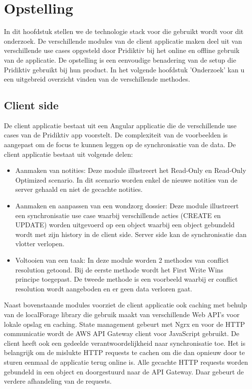 
\chapter{Opstelling}
\label{ch:setup}


In dit hoofdstuk stellen we de technologie stack voor die gebruikt wordt voor dit onderzoek. De verschillende modules van de client applicatie maken deel uit van verschillende use cases opgesteld door Pridiktiv bij het online en offline gebruik van de applicatie. De opstelling is een eenvoudige benadering van de setup die Pridiktiv gebruikt bij hun product. In het volgende hoofdstuk 'Onderzoek' kan u een uitgebreid overzicht vinden van de verschillende methodes. 

\section{Client side}
De client applicatie bestaat uit een Angular applicatie die de verschillende use cases van de Pridiktiv app voorstelt. De complexiteit van de voorbeelden is aangepast om de focus te kunnen leggen op de synchronisatie van de data. De client applicatie bestaat uit volgende delen:
\begin{itemize}
\item Aanmaken van notities: Deze module illustreert het Read-Only en Read-Only Optimized scenario. In dit scenario worden enkel de nieuwe notities van de server gehaald en niet de gecachte notities.
\item Aanmaken en aanpassen van een wondzorg dossier: Deze module illustreert een synchronisatie use case waarbij verschillende acties (CREATE en UPDATE) worden uitgevoerd op een object waarbij een object gebundeld wordt met zijn history in de client side. Server side kan de synchronisatie dan vlotter verlopen.
\item Voltooien van een taak: In deze module worden 2 methodes van conflict resolution getoond. Bij de eerste methode wordt het First Write Wins principe toegepast. De tweede methode is een voorbeeld waarbij er conflict resolution wordt aangeboden en er geen data verloren gaat.
\end{itemize}
Naast bovenstaande modules voorziet de client applicatie ook caching met behulp van de localForage library die gebruik maakt van verschillende Web API's voor lokale opslag en caching. State management gebeurt met Ngrx en voor de HTTP communicatie wordt de AWS API Gateway client voor JavaScript gebruikt. De client heeft ook een gedeelde verantwoordelijkheid naar synchronisatie toe. Het is belangrijk om de mislukte HTTP requests te cachen om die dan opnieuw door te sturen eenmaal de applicatie terug online is. Alle gecachte HTTP requests worden gebundeld in een object en doorgestuurd naar de API Gateway. Daar gebeurt de verdere afhandeling van de requests.
